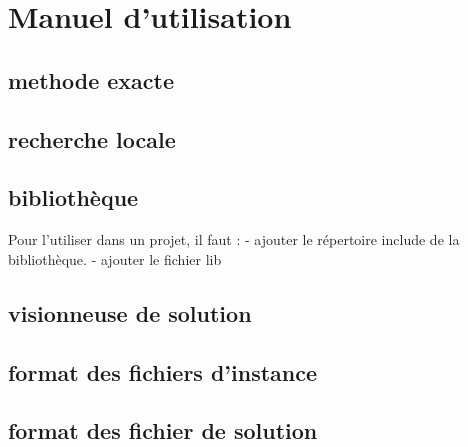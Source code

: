 \chapter{Manuel d'utilisation}

\section{methode exacte}
\section{recherche locale}
\section{bibliothèque}
Pour l'utiliser dans un projet, il faut :
- ajouter le répertoire include de la bibliothèque.
- ajouter le fichier lib
\section{visionneuse de solution}

\section{format des fichiers d'instance}

\section{format des fichier de solution}

